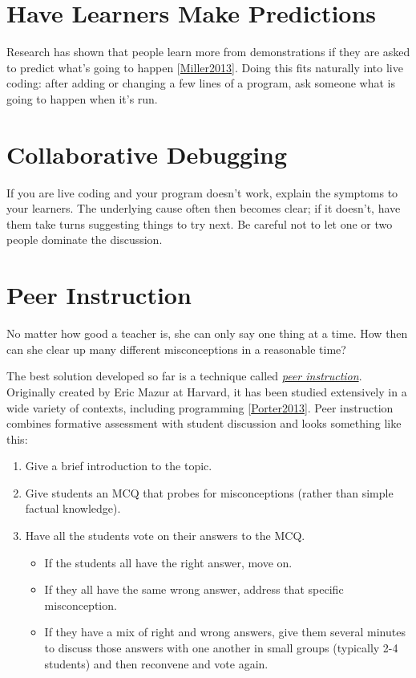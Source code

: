 \documentclass[10pt,statementpaper]{memoir}
\providecommand{\tightlist}{%
  \setlength{\itemsep}{0pt}\setlength{\parskip}{0pt}}
\begin{document}
\section{Have Learners Make
Predictions}\label{have-learners-make-predictions}

Research has shown that people learn more from demonstrations if they
are asked to predict what's going to happen
{[}\href{biblio.html\#miller-predictions}{Miller2013}{]}. Doing this
fits naturally into live coding: after adding or changing a few lines of
a program, ask someone what is going to happen when it's run.

\section{Collaborative Debugging}\label{collaborative-debugging}

If you are live coding and your program doesn't work, explain the
symptoms to your learners. The underlying cause often then becomes
clear; if it doesn't, have them take turns suggesting things to try
next. Be careful not to let one or two people dominate the discussion.

\section{Peer Instruction}\label{peer-instruction}

No matter how good a teacher is, she can only say one thing at a time.
How then can she clear up many different misconceptions in a reasonable
time?

The best solution developed so far is a technique called
\emph{\href{gloss.html\#peer-instruction}{peer instruction}}. Originally
created by Eric Mazur at Harvard, it has been studied extensively in a
wide variety of contexts, including programming
{[}\href{biblio.html\#porter-what-works}{Porter2013}{]}. Peer
instruction combines formative assessment with student discussion and
looks something like this:

\begin{enumerate}
\def\labelenumi{\arabic{enumi}.}
\item
  Give a brief introduction to the topic.
\item
  Give students an MCQ that probes for misconceptions (rather than
  simple factual knowledge).
\item
  Have all the students vote on their answers to the MCQ.

  \begin{itemize}
  \tightlist
  \item
    If the students all have the right answer, move on.
  \item
    If they all have the same wrong answer, address that specific
    misconception.
  \item
    If they have a mix of right and wrong answers, give them several
    minutes to discuss those answers with one another in small groups
    (typically 2-4 students) and then reconvene and vote again.
  \end{itemize}
\end{enumerate}
\end{document}
